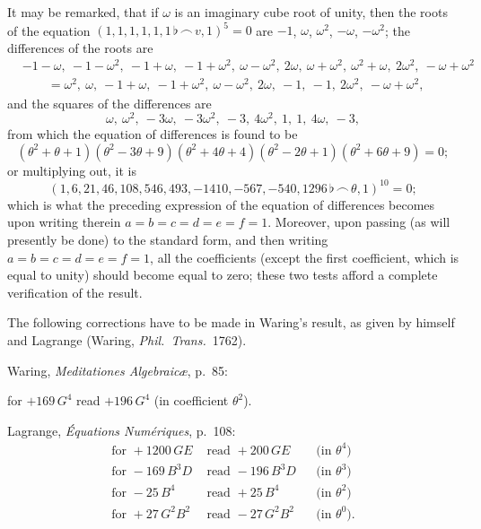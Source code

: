 \documentclass[11pt,a4paper]{book}
\begin{document}
It may be remarked, that if $\omega$ is an imaginary cube root of unity, then the roots of the equation $(1,1,1,1,1,1\,\flat\,\frown\, v,1)^5=0$ are $-1$, $\omega$, $\omega^2$, $-\omega$, $-\omega^2$; the differences of the roots are
\begin{align*}
&-1-\omega,\ -1-\omega^2,\ -1+\omega,\ -1+\omega^2,\ \omega-\omega^2,\ 2\omega,\ \omega+\omega^2,\ \omega^2+\omega,\ 2\omega^2,\ -\omega+\omega^2\\
&\qquad=\omega^2,\ \omega,\ -1+\omega,\ -1+\omega^2,\ \omega-\omega^2,\ 2\omega,\ -1,\ -1,\ 2\omega^2,\ -\omega+\omega^2,
\end{align*}
and the squares of the differences are
\[
\omega,\ \omega^2,\ -3\omega,\ -3\omega^2,\ -3,\ 4\omega^2,\ 1,\ 1,\ 4\omega,\ -3,
\]
from which the equation of differences is found to be
\[
(\theta^2+\theta+1)(\theta^2-3\theta+9)(\theta^2+4\theta+4)(\theta^2-2\theta+1)(\theta^2+6\theta+9)=0;
\]
or multiplying out, it is
\[
(1,6,21,46,108,546,493,-1410,-567,-540,1296\,\flat\,\frown\,\theta,1)^{10}=0;
\]
which is what the preceding expression of the equation of differences becomes upon writing therein $a=b=c=d=e=f=1$. Moreover, upon passing (as will presently be done) to the standard form, and then writing $a=b=c=d=e=f=1$, all the coefficients (except the first coefficient, which is equal to unity) should become equal to zero; these two tests afford a complete verification of the result.

The following corrections have to be made in Waring's result, as given by himself and Lagrange (Waring, \textit{Phil.\ Trans.}\ 1762).

Waring, \textit{Meditationes Algebraic\ae}, p.~85:

for $+169\,G^4$ read $+196\,G^4$ (in coefficient $\theta^2$).

Lagrange, \textit{\'{E}quations Num\'{e}riques}, p.~108:
\begin{align*}
\text{for }+1200\,GE &\text{ read }+200\,GE &&\text{(in $\theta^4$)}\\
\text{for }-169\,B^3D &\text{ read }-196\,B^3D &&\text{(in $\theta^3$)}\\
\text{for }-25\,B^4 &\text{ read }+25\,B^4 &&\text{(in $\theta^2$)}\\
\text{for }+27\,G^2B^2 &\text{ read }-27\,G^2B^2 &&\text{(in $\theta^0$)}.
\end{align*}
\end{document}
